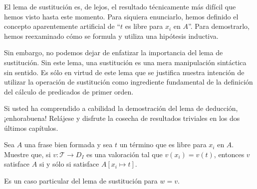 \begin{reflection}
El lema de sustitución es, de lejos, el resultado técnicamente más difícil que hemos visto hasta este momento. Para siquiera enunciarlo, hemos definido el concepto aparentemente artificial de ``$t$ es libre para $x_i$ en $A$''. Para demostrarlo, hemos reexaminado cómo se formula y utiliza una hipótesis inductiva.

Sin embargo, no podemos dejar de enfatizar la importancia del lema de sustitución. Sin este lema, una sustitución es una mera manipulación sintáctica sin sentido. Es sólo en virtud de este lema que se justifica nuestra intención de utilizar la operación de sustitución como ingrediente fundamental de la definición del cálculo de predicados de primer orden.

Si usted ha comprendido a cabilidad la demostración del lema de deducción, ¡enhorabuena! Relájese y disfrute la cosecha de resultados triviales en los dos últimos capítulos.
\end{reflection}

\setcounter{exercise}{22}
\begin{exercise}
Sea $A$ una frase bien formada y sea $t$ un término que es libre para $x_i$ en $A$. Muestre que, si $v : \mathscr T \to D_I$ es una valoración tal que $v(x_i) = v(t)$, entonces $v$ satisface $A$ si y sólo si satisface $A[x_i \mapsto t]$.
\end{exercise}

\begin{solution}
Es un caso particular del lema de sustitución para $w = v$.
\end{solution}
